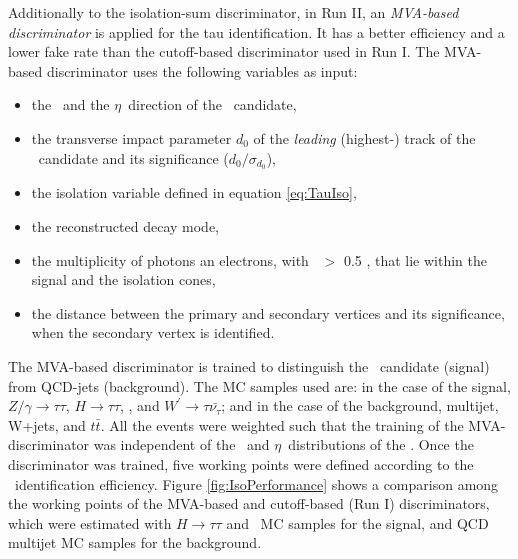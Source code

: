 \noindent Additionally to the isolation-sum discriminator, in Run II, an \textit{MVA-based discriminator}
is applied for the tau identification. It has a better efficiency and a lower 
fake rate than the cutoff-based discriminator used in Run I. The MVA-based discriminator 
uses the following variables as input:
\begin{itemize}
 \item the \pt~and the $\eta$~direction of the \tauh~candidate,
  \item the transverse impact parameter $d_{0}$ of the \textit{leading} (highest-\pt) 
  track of the \tauh~candidate and its significance ($d_{0}/\sigma_{d_{0}}$),
 \item the isolation variable defined in equation \ref{eq:TauIso},
 \item the reconstructed decay mode,
 \item the multiplicity of photons an electrons, with \pt~$>$ 0.5 \GeV, that lie 
 within the signal and the isolation cones,
 \item the distance between the primary and secondary vertices and its significance, when
 the secondary vertex is identified.
\end{itemize}

\noindent The MVA-based discriminator is trained to distinguish the 
\tauh~candidate (signal) from QCD-jets (background). The MC samples used are: 
in the case of the signal, $Z/\gamma \rightarrow \tau\tau$, 
$H \rightarrow \tau\tau$, \Zprimetotautau, and $W^{\prime} \rightarrow 
\tau\bar{\nu_{\tau}}$; and in the case of the background, multijet, W+jets, and 
$t\bar{t}$. All the events were weighted such that the 
training of the MVA-discriminator was independent of the \pt~and 
$\eta$~distributions of the \tauh. Once the discriminator was trained, five working points were
defined according to the \tauh~identification efficiency. Figure \ref{fig:IsoPerformance} shows 
a comparison among the working points of the MVA-based and 
cutoff-based (Run I) discriminators, which were estimated 
with $H \rightarrow \tau\tau$ and \Zprimetotautau~MC samples for the 
signal, and QCD multijet MC samples for the background. 

